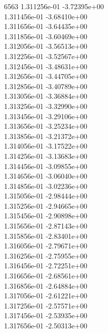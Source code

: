 6563	1.311256e-01	-3.72395e+00	\\ 	1.311456e-01	-3.68410e+00	\\ 	1.311656e-01	-3.64435e+00	\\ 	1.311856e-01	-3.60469e+00	\\ 	1.312056e-01	-3.56513e+00	\\ 	1.312256e-01	-3.52567e+00	\\ 	1.312456e-01	-3.48631e+00	\\ 	1.312656e-01	-3.44705e+00	\\ 	1.312856e-01	-3.40789e+00	\\ 	1.313056e-01	-3.36884e+00	\\ 	1.313256e-01	-3.32990e+00	\\ 	1.313456e-01	-3.29106e+00	\\ 	1.313656e-01	-3.25234e+00	\\ 	1.313856e-01	-3.21372e+00	\\ 	1.314056e-01	-3.17522e+00	\\ 	1.314256e-01	-3.13683e+00	\\ 	1.314456e-01	-3.09855e+00	\\ 	1.314656e-01	-3.06040e+00	\\ 	1.314856e-01	-3.02236e+00	\\ 	1.315056e-01	-2.98444e+00	\\ 	1.315256e-01	-2.94665e+00	\\ 	1.315456e-01	-2.90898e+00	\\ 	1.315656e-01	-2.87143e+00	\\ 	1.315856e-01	-2.83401e+00	\\ 	1.316056e-01	-2.79671e+00	\\ 	1.316256e-01	-2.75955e+00	\\ 	1.316456e-01	-2.72251e+00	\\ 	1.316656e-01	-2.68561e+00	\\ 	1.316856e-01	-2.64884e+00	\\ 	1.317056e-01	-2.61221e+00	\\ 	1.317256e-01	-2.57571e+00	\\ 	1.317456e-01	-2.53935e+00	\\ 	1.317656e-01	-2.50313e+00	\\ \hline
